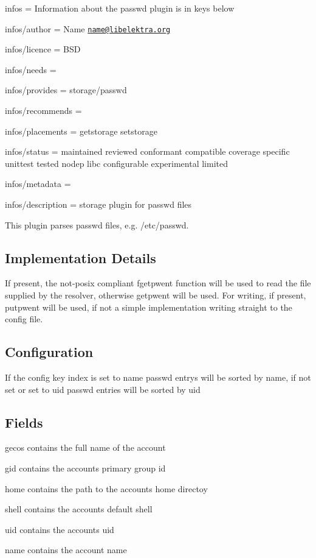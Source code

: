 
\begin{DoxyItemize}
\item infos = Information about the passwd plugin is in keys below
\item infos/author = Name \href{mailto:name@libelektra.org}{\tt name@libelektra.\+org}
\item infos/licence = B\+S\+D
\item infos/needs =
\item infos/provides = storage/passwd
\item infos/recommends =
\item infos/placements = getstorage setstorage
\item infos/status = maintained reviewed conformant compatible coverage specific unittest tested nodep libc configurable experimental limited
\item infos/metadata =
\item infos/description = storage plugin for passwd files
\end{DoxyItemize}

This plugin parses {\ttfamily passwd} files, e.\+g. {\ttfamily /etc/passwd}.

\subsection*{Implementation Details}

If present, the not-\/posix compliant {\ttfamily fgetpwent} function will be used to read the file supplied by the resolver, otherwise {\ttfamily getpwent} will be used. For writing, if present, {\ttfamily putpwent} will be used, if not a simple implementation writing straight to the config file.

\subsection*{Configuration}

If the config key {\ttfamily index} is set to {\ttfamily name} passwd entrys will be sorted by name, if not set or set to {\ttfamily uid} passwd entries will be sorted by uid

\subsection*{Fields}


\begin{DoxyItemize}
\item {\ttfamily gecos} contains the full name of the account
\item {\ttfamily gid} contains the accounts primary group id
\item {\ttfamily home} contains the path to the accounts home directoy
\item {\ttfamily shell} contains the accounts default shell
\item {\ttfamily uid} contains the accounts uid
\item {\ttfamily name} contains the account name
\end{DoxyItemize}

